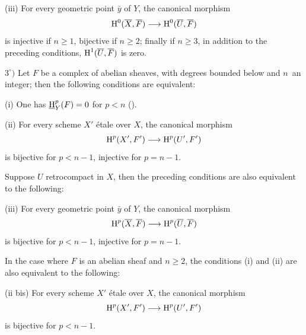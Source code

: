 \begin{proposition}
\textup{(iii)} For every geometric point $\bar{y}$ of $Y$, the canonical morphism
$$
\H^0(\bar{X}, \bar{F})\to \H^0(\bar{U}, \bar{F})
$$
is injective if $n\geq 1$, bijective if $n\geq 2$; finally if $n\geq 3$, in addition to the preceding conditions, $\operatorname{H}^1(\overline{U}, \overline{F})$ is zero.

$3^\circ)$ Let $F$ be a complex of abelian sheaves, with degrees bounded below and $n$~an integer; then the following conditions are equivalent:

\textup{(i)} One has ${\operatorname{\underline{H}}}_Y^p(F)=0$ for $p<n$ ().

\textup{(ii)} For every scheme $X'$ \'etale over $X$, the canonical morphism
$$
\H^p(X', F')\to \H^p(U', F')
$$
is bijective for $p<n-1$, injective for $p=n-1$.

Suppose $U$ retrocompact in $X$, then the preceding conditions are also equivalent to the following:

\textup{(iii)} For every geometric point $\bar{y}$ of $Y$, the canonical morphism
$$
\H^p(\bar{X}, \bar{F})\to \H^p(\bar{U}, \bar{F})$$
is bijective for $p<n-1$, injective for $p=n-1$.

In the case where $F$ is an abelian sheaf and $n\geq 2$, the conditions \textup{(i)} and \textup{(ii)} are also equivalent to the following:

\textup{(ii bis)} For every scheme $X'$ \'etale over $X$, the canonical morphism
$$
\H^p(X', F')\to \H^p(U', F')$$
is bijective for $p<n-1$.
\end{proposition}

